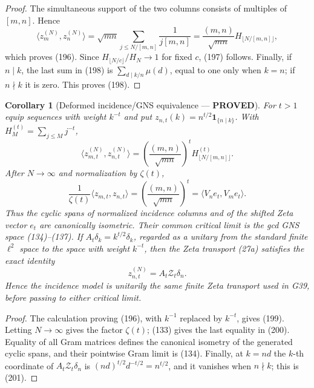 \documentclass[11pt]{article}
\newtheorem{corollary}[theorem]{Corollary}
\newcommand{\PROVED}{\textcolor{green!45!black}{\textbf{PROVED}}}
\begin{document}
\begin{proof}
The simultaneous support of the two columns consists of multiples of
$[m,n]$.  Hence
\[
 \langle z_m^{(N)},z_n^{(N)}\rangle
 =\sqrt{mn}\sum_{j\le N/[m,n]}\frac1{j[m,n]}
 =\frac{(m,n)}{\sqrt{mn}}H_{\lfloor N/[m,n]\rfloor},
\]
which proves (196).  Since $H_{\lfloor N/c\rfloor}/H_N\to1$ for fixed $c$,
(197) follows.  Finally, if $n\mid k$, the last sum in (198) is
$\sum_{d\mid k/n}\mu(d)$, equal to one only when $k=n$; if $n\nmid k$ it
is zero.  This proves (198).
\end{proof}

\begin{corollary}[Deformed incidence/GNS equivalence --- \PROVED]
For $t>1$ equip sequences with weight $k^{-t}$ and put
$z_{n,t}(k)=n^{t/2}\mathbf1_{\{n\mid k\}}$.  With
$H_M^{(t)}=\sum_{j\le M}j^{-t}$,
\begin{equation}
 \langle z_{m,t}^{(N)},z_{n,t}^{(N)}\rangle
 =\left(\frac{(m,n)}{\sqrt{mn}}\right)^t
   H_{\lfloor N/[m,n]\rfloor}^{(t)}.                \tag{199}
\end{equation}
After $N\to\infty$ and normalization by $\zeta(t)$,
\begin{equation}
 \frac1{\zeta(t)}\langle z_{m,t},z_{n,t}\rangle
 =\left(\frac{(m,n)}{\sqrt{mn}}\right)^t
 =\langle V_ne_t,V_me_t\rangle.                     \tag{200}
\end{equation}
Thus the cyclic spans of normalized incidence columns and of the shifted
Zeta vector $e_t$ are canonically isometric.  Their common critical limit is
the gcd GNS space (134)--(137).
If $A_t\delta_k=k^{t/2}\delta_k$, regarded as a unitary from the standard
finite $\ell^2$ space to the space with weight $k^{-t}$, then the Zeta
transport (27a) satisfies the exact identity
\begin{equation}
 z_{n,t}^{(N)}=A_t\mathscr Z_t\delta_n.               \tag{201}
\end{equation}
Hence the incidence model is unitarily the same finite Zeta transport used
in G39, before passing to either critical limit.
\end{corollary}

\begin{proof}
The calculation proving (196), with $k^{-1}$ replaced by $k^{-t}$, gives
(199).  Letting $N\to\infty$ gives the factor $\zeta(t)$; (133) gives the
last equality in (200).  Equality of all Gram matrices defines the canonical
isometry of the generated cyclic spans, and their pointwise Gram limit is
(134).  Finally, at $k=nd$ the $k$-th coordinate of
$A_t\mathscr Z_t\delta_n$ is
$(nd)^{t/2}d^{-t/2}=n^{t/2}$, and it vanishes when $n\nmid k$; this is
(201).
\end{proof}
\end{document}
